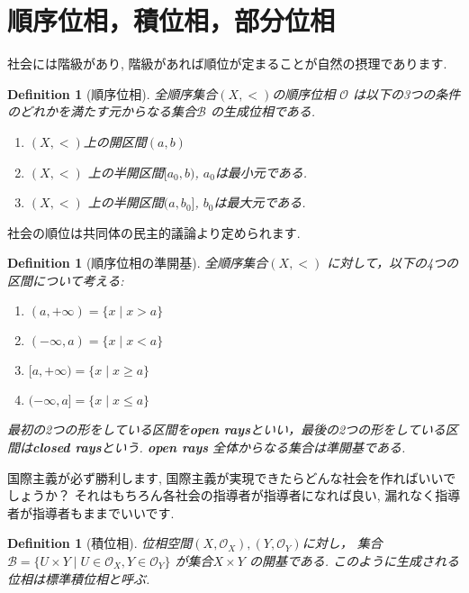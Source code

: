 \documentclass[lualatex]{ltjsbook}
\newtheorem{definition}[theorem]{Definition}
\theoremstyle{remark}
\theoremstyle{plain}
\begin{document}
\section{順序位相，積位相，部分位相}

社会には階級があり, 階級があれば順位が定まることが自然の摂理であります.
\begin{definition}[順序位相]
全順序集合$(X,<)$の順序位相 $\mathcal{O}$ は以下の3つの条件のどれかを満たす元からなる集合$\mathcal{B}$ の生成位相である.

\begin{enumerate}
	\item $\left( X, < \right) $上の開区間$\left( a,b \right) $
	\item $\left( X,< \right) $ 上の半開区間$[a_0,b)$, $a_0$は最小元である.
	\item  $\left( X, < \right) $ 上の半開区間$(a,b_0]$, $b_0$は最大元である.
\end{enumerate}

\end{definition}

社会の順位は共同体の民主的議論より定められます.

\begin{definition}[順序位相の準開基]
全順序集合$\left( X,< \right) $ に対して，以下の4つの区間について考える:
	\begin{enumerate}
		\item $(a,+\infty)=\{x  \mid x>a	\}$
		\item $(-\infty , a)= \{ x  \mid  x< a \}$
		\item $[a,+\infty)= \{ x \mid x \ge a \}$
		\item  $(-\infty,a]= \{x  \mid x \le a \}$
	\end{enumerate}
	最初の2つの形をしている区間を\textbf{open rays}といい，最後の2つの形をしている区間は\textbf{closed rays}という.
	\textbf{open rays} 全体からなる集合は準開基である.
\end{definition}

国際主義が必ず勝利します, 国際主義が実現できたらどんな社会を作ればいいでしょうか？ それはもちろん各社会の指導者が指導者になれば良い, 漏れなく指導者が指導者もままでいいです.

\begin{definition}[積位相]
	位相空間$(X,\mathcal{O}_X),(Y,\mathcal{O}_Y)$に対し， 
	集合$\mathcal{B}=\{ U \times Y  \mid U \in \mathcal{O}_X, Y \in \mathcal{O}_Y\}$ が集合$X \times Y$ の開基である.
	このように生成される位相は標準積位相と呼ぶ.
\end{definition}
\end{document}

